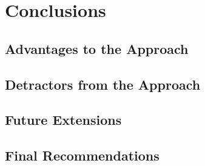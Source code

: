 \documentclass[11pt]{article} %
\begin{document}
\section{Conclusions}
\label{sec:conclusions}

\subsection{Advantages to the Approach}
\label{sec:pros}

\subsection{Detractors from the Approach}
\label{sec:cons}

\subsection{Future Extensions}


\subsection{Final Recommendations}
\label{sec:final}






\end{document}
